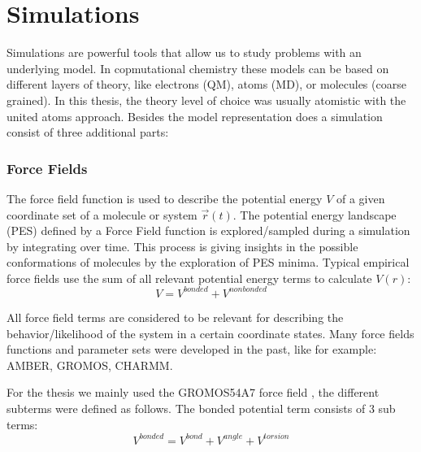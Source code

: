 \section{Simulations}
Simulations are powerful tools that allow us to study problems with an underlying model. In copmutational chemistry these models can be based on different layers of theory, like electrons (QM), atoms (MD), or molecules (coarse grained). In this thesis, the theory level of choice was usually atomistic with the united atoms approach. Besides the model representation does a simulation consist of three additional parts: 

\subsubsection{Force Fields}
The force field function is used to describe the potential energy $V$ of a given coordinate set of a molecule or system $\vec{r}(t)$. The potential energy landscape (PES) defined by a Force Field function is explored/sampled during a simulation by integrating over time. This process is giving insights in the possible conformations of molecules by the exploration of PES minima. Typical empirical force fields use the sum of all relevant potential energy terms to calculate $V(r)$:
\begin{equation}
    V = V^{bonded} + V^{nonbonded} 
\end{equation}

All force field terms are considered to be relevant for describing the behavior/likelihood of the system in a certain coordinate states. Many force fields functions and parameter sets were developed in the past, like for example: AMBER\cite{}, GROMOS\cite{}, CHARMM\cite{}.

For the thesis we mainly used the GROMOS54A7 force field , the different subterms were defined as follows. 
The bonded potential term consists of 3 sub terms:
\begin{equation}
   V^{bonded} = V^{bond} + V^{angle} + V^{torsion}  
\end{equation}

